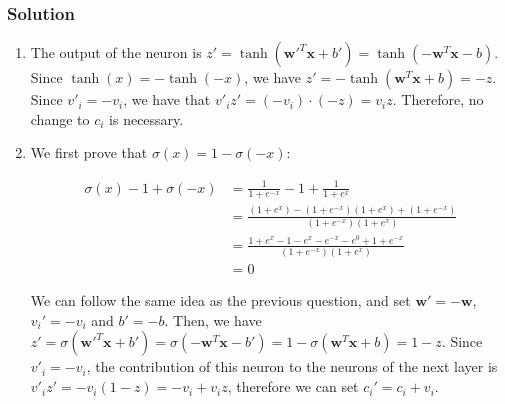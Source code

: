 \documentclass[
]{article}
\begin{document}
\hypertarget{solution-1}{%
\subsubsection{Solution}\label{solution-1}}

\begin{enumerate}
\def\labelenumi{\arabic{enumi}.}
\item
  The output of the neuron is
  \(z'=\tanh(\textbf{w}'^T\textbf{x}+b')=\tanh(-\textbf{w}^T\textbf{x}-b)\).
  Since \(\tanh(x)=-\tanh(-x)\), we have
  \(z'=-\tanh(\textbf{w}^T\textbf{x}+b)=-z\). Since \(v'_i=-v_i\), we
  have that \(v'_iz'=(-v_i)\cdot(-z)=v_iz\). Therefore, no change to
  \(c_i\) is necessary.
\item
  We first prove that \(\sigma(x)=1-\sigma(-x)\):

  \begin{align*}
  \sigma(x)-1+\sigma(-x)
  &=\frac{1}{1+e^{-x}}-1+\frac{1}{1+e^x} \\
  &=\frac{(1+e^x)-(1+e^{-x})(1+e^{x})+(1+e^{-x})}{(1+e^{-x})(1+e^{x})} \\
  &=\frac{1+e^x-1-e^x-e^{-x}-e^0+1+e^{-x}}{(1+e^{-x})(1+e^{x})} \\
  &=0
  \end{align*}

  We can follow the same idea as the previous question, and set
  \(\textbf{w}'=-\textbf{w}\), \(v_i'=-v_i\) and \(b'=-b\). Then, we
  have
  \(z'=\sigma(\textbf{w}'^T\textbf{x}+b')=\sigma(-\textbf{w}^T\textbf{x}-b')=1-\sigma(\textbf{w}^T\textbf{x}+b)=1-z\).
  Since \(v'_i=-v_i\), the contribution of this neuron to the neurons of
  the next layer is \(v'_iz'=-v_i(1-z)=-v_i+v_iz\), therefore we can set
  \(c_i'=c_i+v_i\).
\end{enumerate}
\end{document}
